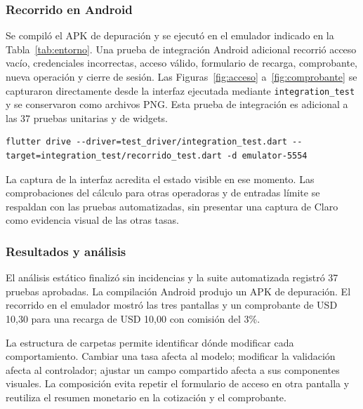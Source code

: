 \documentclass[12pt,letterpaper]{article}
\begin{document}
\subsubsection{Recorrido en Android}
Se compiló el APK de depuración y se ejecutó en el emulador indicado en la Tabla~\ref{tab:entorno}. Una prueba de integración Android adicional recorrió acceso vacío, credenciales incorrectas, acceso válido, formulario de recarga, comprobante, nueva operación y cierre de sesión. Las Figuras~\ref{fig:acceso} a~\ref{fig:comprobante} se capturaron directamente desde la interfaz ejecutada mediante \texttt{integration\_test} y se conservaron como archivos PNG. Esta prueba de integración es adicional a las 37 pruebas unitarias y de widgets.
\begin{lstlisting}
flutter drive --driver=test_driver/integration_test.dart --target=integration_test/recorrido_test.dart -d emulator-5554
\end{lstlisting}

La captura de la interfaz acredita el estado visible en ese momento. Las comprobaciones del cálculo para otras operadoras y de entradas límite se respaldan con las pruebas automatizadas, sin presentar una captura de Claro como evidencia visual de las otras tasas.

\subsubsection{Resultados y análisis}
El análisis estático finalizó sin incidencias y la suite automatizada registró 37 pruebas aprobadas. La compilación Android produjo un APK de depuración. El recorrido en el emulador mostró las tres pantallas y un comprobante de USD 10,30 para una recarga de USD 10,00 con comisión del 3\%.

La estructura de carpetas permite identificar dónde modificar cada comportamiento. Cambiar una tasa afecta al modelo; modificar la validación afecta al controlador; ajustar un campo compartido afecta a sus componentes visuales. La composición evita repetir el formulario de acceso en otra pantalla y reutiliza el resumen monetario en la cotización y el comprobante.
\end{document}
